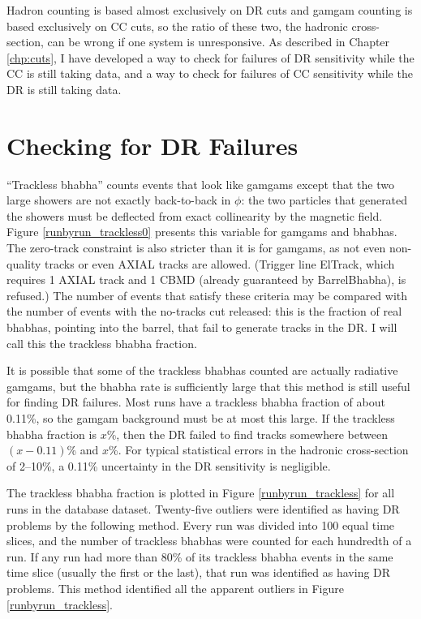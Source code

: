 Hadron counting is based almost exclusively on DR cuts and gamgam
counting is based exclusively on CC cuts, so the ratio of these two,
the hadronic cross-section, can be wrong if one system is
unresponsive.  As described in Chapter \ref{chp:cuts}, I have
developed a way to check for failures of DR sensitivity while the CC
is still taking data, and a way to check for failures of CC
sensitivity while the DR is still taking data.

\section{Checking for DR Failures}

``Trackless bhabha'' counts events that look like
gamgams except that the two large showers are not exactly back-to-back
in $\phi$: the two particles that generated the showers must be
deflected from exact collinearity by the magnetic field.  Figure
\ref{runbyrun_trackless0} presents this variable for gamgams and
bhabhas.  The zero-track constraint is also stricter than it is for
gamgams, as not even non-quality tracks or even AXIAL tracks are
allowed.  (Trigger line ElTrack, which requires 1 AXIAL track and 1
CBMD (already guaranteed by BarrelBhabha), is refused.)  The number of
events that satisfy these criteria may be compared with the number of
events with the no-tracks cut released: this is the fraction of real
bhabhas, pointing into the barrel, that fail to generate tracks in the
DR.  I will call this the trackless bhabha fraction.

It is possible that some of the trackless bhabhas counted are actually
radiative gamgams, but the bhabha rate is sufficiently large that this
method is still useful for finding DR failures.  Most runs have a
trackless bhabha fraction of about 0.11\%, so the gamgam background
must be at most this large.  If the trackless bhabha fraction is
$x$\%, then the DR failed to find tracks somewhere between
$(x-0.11)$\% and $x$\%.  For typical statistical errors in the
hadronic cross-section of 2--10\%, a 0.11\% uncertainty in the DR
sensitivity is negligible.

The trackless bhabha fraction is plotted in Figure
\ref{runbyrun_trackless} for all runs in the database dataset.
Twenty-five outliers were identified as having DR problems by the
following method.  Every run was divided into 100 equal time slices,
and the number of trackless bhabhas were counted for each hundredth of
a run.  If any run had more than 80\% of its trackless bhabha events
in the same time slice (usually the first or the last), that run was
identified as having DR problems.  This method identified all the
apparent outliers in Figure \ref{runbyrun_trackless}.

